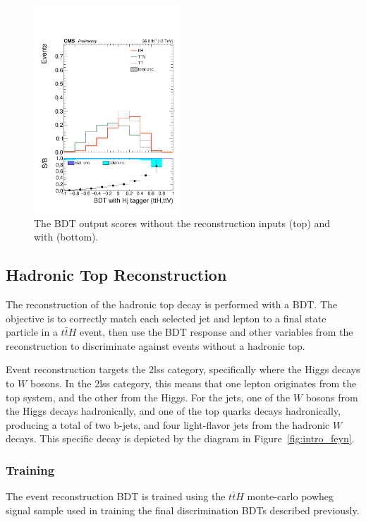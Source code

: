 \begin{figure}[htp]
\includegraphics[width=0.49\textwidth]{ch9_figs/kinMVA_2lss_ttV_withHj.pdf}
\caption[BDT output scores with and without reconstruction inputs]{The BDT output scores without the reconstruction inputs (top) and with (bottom).}
\label{fig:inputs3}
\end{figure}

\subsection{Hadronic Top Reconstruction}
The reconstruction of the hadronic top decay is performed with a BDT. The objective is to correctly match
each selected jet and lepton to a final state particle in a $t\bar{t}H$ event, then
use the BDT response and other variables from the reconstruction to discriminate
against events without a hadronic top.     

Event reconstruction targets the 2lss category, specifically where the Higgs decays
to $W$ bosons. In the 2lss category, this means that one lepton originates from the
top system, and the other from the Higgs. For the jets, one of the
$W$ bosons from the Higgs decays hadronically, and one of the top quarks decays
hadronically, producing a total of two b-jets, and four light-flavor jets
from the hadronic $W$ decays. This specific decay is depicted by the diagram in Figure~\ref{fig:intro_feyn}.   

\subsubsection{Training}
The event reconstruction BDT is trained using the $t\bar{t}H$ monte-carlo powheg
signal sample used in training the final discrimination BDTs described previously.

